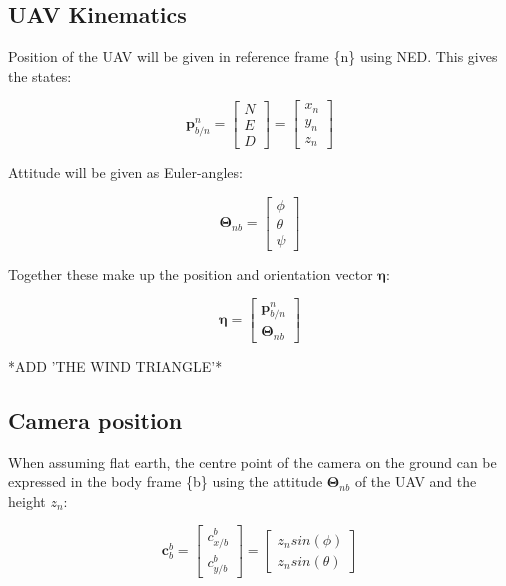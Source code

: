 \documentclass{article}
\begin{document}
\subsection*{UAV Kinematics}
Position of the UAV will be given in reference frame \{n\} using NED. This gives the states:

\begin{equation}
	\bm{p}^n_{b/n} =
	\begin{bmatrix}
		N \\ E \\ D
	\end{bmatrix}
	=
	\begin{bmatrix}
		x_n \\ y_n \\ z_n
	\end{bmatrix}
\end{equation}

Attitude will be given as Euler-angles:

\begin{equation}
	\bm{\Theta}_{nb} = 
	\begin{bmatrix}
		\phi \\ \theta \\ \psi
	\end{bmatrix}
\end{equation}

Together these make up the position and orientation vector $\bm{\eta}$:

\begin{equation}
	\bm{\eta} = 
	\begin{bmatrix}
		\bm{p}^n_{b/n} \\ \bm{\Theta}_{nb}
	\end{bmatrix}
\end{equation}

*ADD 'THE WIND TRIANGLE'*

\subsection*{Camera position}

When assuming flat earth, the centre point of the camera on the ground can be expressed in the body frame \{b\} using the attitude $\bm{\Theta}_{nb}$ of the UAV and the height $z_n$:

\begin{equation}
	\bm{c}_b^b = 
	\begin{bmatrix}
		c_{x/b}^b \\ c_{y/b}^b
	\end{bmatrix}
	=
	\begin{bmatrix}
		z_n sin(\phi) \\ z_n sin(\theta)
	\end{bmatrix}
\end{equation}
\end{document}
